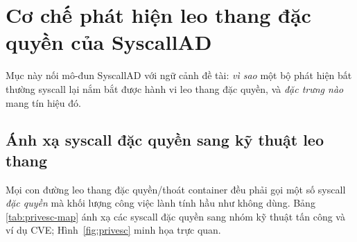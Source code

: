 \section{Cơ chế phát hiện leo thang đặc quyền của SyscallAD}
\label{sec:privesc}

Mục này nối mô-đun SyscallAD với ngữ cảnh đề tài: \emph{vì sao} một bộ phát hiện bất
thường syscall lại nắm bắt được hành vi leo thang đặc quyền, và \emph{đặc trưng nào}
mang tín hiệu đó.

\subsection{Ánh xạ syscall đặc quyền sang kỹ thuật leo thang}
Mọi con đường leo thang đặc quyền/thoát container đều phải gọi một số syscall
\emph{đặc quyền} mà khối lượng công việc lành tính hầu như không dùng. Bảng~%
\ref{tab:privesc-map} ánh xạ các syscall đặc quyền sang nhóm kỹ thuật tấn công và ví
dụ CVE; Hình~\ref{fig:privesc} minh họa trực quan.

